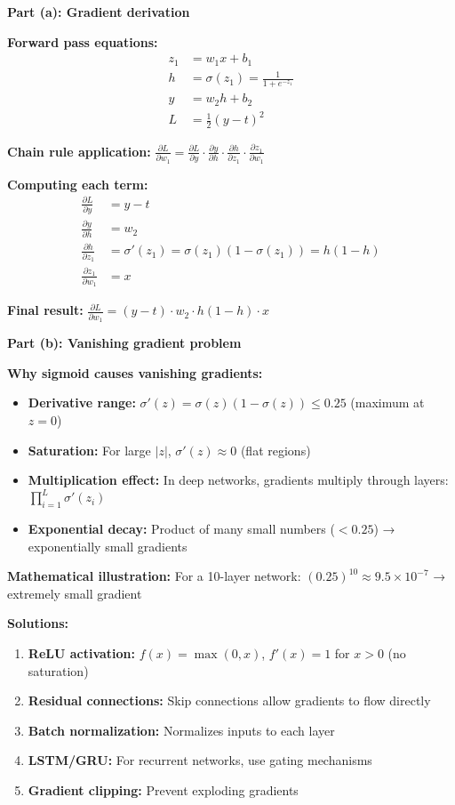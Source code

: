 \documentclass{../../common/quals-template}
\begin{document}
\begin{questions}
\begin{solution}
\textbf{Part (a): Gradient derivation}

\textbf{Forward pass equations:}
\begin{align}
z_1 &= w_1 x + b_1\\
h &= \sigma(z_1) = \frac{1}{1 + e^{-z_1}}\\
y &= w_2 h + b_2\\
L &= \frac{1}{2}(y - t)^2
\end{align}

\textbf{Chain rule application:}
$\frac{\partial L}{\partial w_1} = \frac{\partial L}{\partial y} \cdot \frac{\partial y}{\partial h} \cdot \frac{\partial h}{\partial z_1} \cdot \frac{\partial z_1}{\partial w_1}$

\textbf{Computing each term:}
\begin{align}
\frac{\partial L}{\partial y} &= y - t\\
\frac{\partial y}{\partial h} &= w_2\\
\frac{\partial h}{\partial z_1} &= \sigma'(z_1) = \sigma(z_1)(1 - \sigma(z_1)) = h(1-h)\\
\frac{\partial z_1}{\partial w_1} &= x
\end{align}

\textbf{Final result:}
$\boxed{\frac{\partial L}{\partial w_1} = (y - t) \cdot w_2 \cdot h(1-h) \cdot x}$

\textbf{Part (b): Vanishing gradient problem}

\textbf{Why sigmoid causes vanishing gradients:}
\begin{itemize}
\item \textbf{Derivative range:} $\sigma'(z) = \sigma(z)(1-\sigma(z)) \leq 0.25$ (maximum at $z=0$)
\item \textbf{Saturation:} For large $|z|$, $\sigma'(z) \approx 0$ (flat regions)
\item \textbf{Multiplication effect:} In deep networks, gradients multiply through layers: $\prod_{i=1}^L \sigma'(z_i)$
\item \textbf{Exponential decay:} Product of many small numbers ($< 0.25$) → exponentially small gradients
\end{itemize}

\textbf{Mathematical illustration:}
For a 10-layer network: $(0.25)^{10} \approx 9.5 \times 10^{-7}$ → extremely small gradient

\textbf{Solutions:}
\begin{enumerate}
\item \textbf{ReLU activation:} $f(x) = \max(0,x)$, $f'(x) = 1$ for $x > 0$ (no saturation)
\item \textbf{Residual connections:} Skip connections allow gradients to flow directly
\item \textbf{Batch normalization:} Normalizes inputs to each layer
\item \textbf{LSTM/GRU:} For recurrent networks, use gating mechanisms
\item \textbf{Gradient clipping:} Prevent exploding gradients
\end{enumerate}
\end{solution}


\end{questions}
\end{document}
